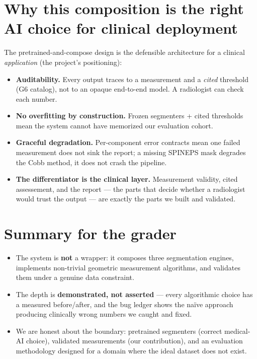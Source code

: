 \documentclass[11pt]{article}
\begin{document}
\section{Why this composition is the right AI choice for clinical deployment}
The pretrained-and-compose design is the defensible architecture for a clinical \emph{application} (the
project's positioning):
\begin{itemize}
  \item \textbf{Auditability.} Every output traces to a measurement and a \emph{cited} threshold (G6
  catalog), not to an opaque end-to-end model. A radiologist can check each number.
  \item \textbf{No overfitting by construction.} Frozen segmenters + cited thresholds mean the system
  cannot have memorized our evaluation cohort.
  \item \textbf{Graceful degradation.} Per-component error contracts mean one failed measurement does
  not sink the report; a missing SPINEPS mask degrades the Cobb method, it does not crash the pipeline.
  \item \textbf{The differentiator is the clinical layer.} Measurement validity, cited assessement,
  and the report --- the parts that decide whether a radiologist would trust the output --- are exactly
  the parts we built and validated.
\end{itemize}

\section{Summary for the grader}
\begin{itemize}
  \item The system is \textbf{not} a wrapper: it composes three segmentation engines, implements
  non-trivial geometric measurement algorithms, and validates them under a genuine data constraint.
  \item The depth is \textbf{demonstrated, not asserted} --- every algorithmic choice has a measured
  before/after, and the bug ledger shows the na\"ive approach producing clinically wrong numbers we
  caught and fixed.
  \item We are honest about the boundary: pretrained segmenters (correct medical-AI choice), validated
  measurements (our contribution), and an evaluation methodology designed for a domain where the ideal
  dataset does not exist.
\end{itemize}
\end{document}
